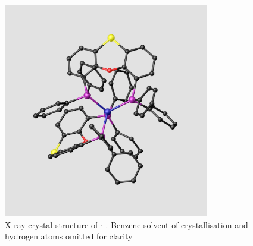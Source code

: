 \begin{figure}[ht]
\begin{center}
\includegraphics[width=0.8\textwidth]{../Figures/Crystalbisthixantphosplatinum.pdf}
\caption[X-ray crystal structure of ]{X-ray crystal structure of $\cdot{}$ .  Benzene solvent of crystallisation and hydrogen atoms omitted for clarity}
\label{Crystal:bisthixantphosplatinum}
\end{center}
\end{figure}

